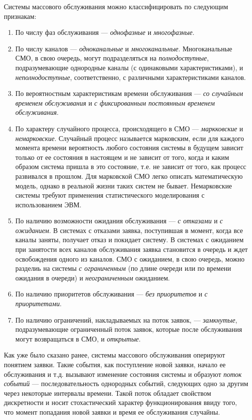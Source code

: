 Системы массового обслуживания можно классифицировать по следующим признакам:
\begin{enumerate}
	\item По числу фаз обслуживания --- \textit{однофазные} и \textit{многофазные}.
	\item По числу каналов --- \textit{одноканальные} и \textit{многоканальные}. Многоканальные СМО, в свою очередь, могут подразделяться на \textit{полнодоступные}, подразумевающие однородные каналы (с одинаковыми характеристиками), и \textit{неполнодоступные}, соответственно, с различными характеристиками каналов.
	\item По вероятностным характеристикам времени обслуживания --- \textit{со случайным временем обслуживания} и \textit{с фиксированным постоянным временем обслуживания}.
	\item По характеру случайного процесса, происходящего в СМО --- \textit{маркковские} и \textit{немарковские}. Случайный процесс называется марковским, если для каждого момента времени вероятность любого состояния системы в будущем зависит только от ее состояния в настоящем и не зависит от того, когда и каким образом система пришла в это состояние, т.е. не зависит от того, как процесс развивался в прошлом. Для марковской СМО легко описать математическую модель, однако в реальной жизни таких систем не бывает. Немарковские системы требуют применения статистического моделирования с использованием ЭВМ.
	\item По наличию возможности ожидания обслуживания  --- \textit{с отказами} и \textit{с ожиданием}. В системах с отказами заявка, поступившая в момент, когда все каналы заняты, получает отказ и покидает систему. В системах с ожиданием при занятости всех каналов обслуживания заявка становится в очередь и ждет освобождения одного из каналов. СМО с ожиданием, в свою очередь, можно разделиь на системы \textit{с ограниченным} (по длине очереди или по времени ожидания в очереди) и \textit{неограниченным} ожиданием.
	\item По наличию приоритетов обслуживания --- \textit{без приоритетов} и \textit{с приоритетами}.
	\item По наличию ограничений, накладываемых на поток заявок, --- \textit{замкнутые}, подразумевающие ограниченный поток заявок, которые после обслуживания могут возвращаться в СМО, и \textit{открытые}.
\end{enumerate}


Как уже было сказано ранее, системы массового обслуживания оперируют понятием заявки. Такие события, как поступление новой заявки, начало ее обслуживания и т.д. вызывают изменение состояния системы и образуют \textit{поток событий} --- последовательность однородных событий, следующих одно за другим через некоторые интервалы времени. Такой поток обладает свойством дискретности и носит стохастический характер функционирования ввиду того, что момент попадания новой заявки и время ее обслуживания случайны.

